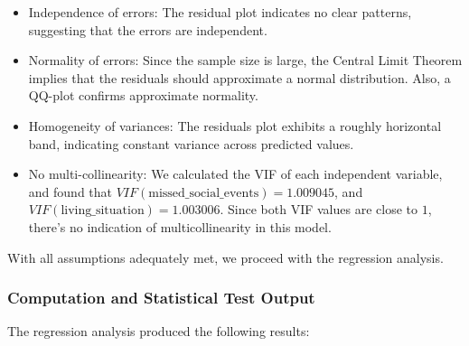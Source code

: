 \documentclass[
  letterpaper,
  DIV=11,
  numbers=noendperiod]{scrartcl}
\providecommand{\tightlist}{%
  \setlength{\itemsep}{0pt}\setlength{\parskip}{0pt}}\usepackage{longtable,booktabs,array}
\begin{document}
\begin{itemize}
\tightlist
\item
  Independence of errors: The residual plot indicates no clear patterns,
  suggesting that the errors are independent.
\item
  Normality of errors: Since the sample size is large, the Central Limit
  Theorem implies that the residuals should approximate a normal
  distribution. Also, a QQ-plot confirms approximate normality.
\item
  Homogeneity of variances: The residuals plot exhibits a roughly
  horizontal band, indicating constant variance across predicted values.
\item
  No multi-collinearity: We calculated the VIF of each independent
  variable, and found that
  \(VIF(\text{missed\_social\_events}) = 1.009045\), and
  \(VIF(\text{living\_situation}) = 1.003006\). Since both VIF values
  are close to \(1\), there's no indication of multicollinearity in this
  model.
\end{itemize}

With all assumptions adequately met, we proceed with the regression
analysis.

\subsubsection{Computation and Statistical Test
Output}\label{computation-and-statistical-test-output-2}

The regression analysis produced the following results:
\end{document}
